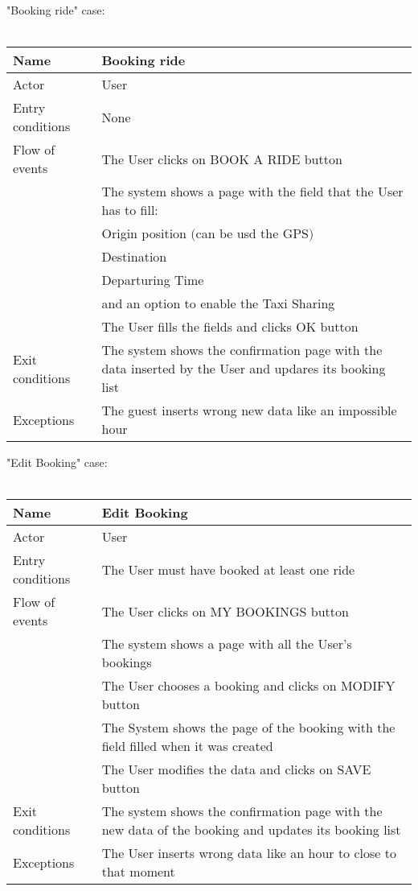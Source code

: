 \newpage
"Booking ride" case:
\\
\\
\begin{tabular}{|l|p{10cm}|} 
\hline
Name & Booking ride\\
\hline
Actor & User\\
\hline
Entry conditions & None\\
\hline
Flow of events
			&	\tabitem The User clicks on BOOK A RIDE button\\
			&	\tabitem The system shows a page with the field that the User has to fill:\\
			&	\tabtratt Origin position $($can be usd the GPS$)$\\
			&	\tabtratt Destination\\
			&	\tabtratt Departuring Time\\
			&	and an option to enable the Taxi Sharing\\
			&	\tabitem The User fills the fields and clicks OK button\\
\hline
Exit conditions & The system shows the confirmation page with the data inserted by the User and updares its booking list\\
\hline
Exceptions & The guest inserts wrong new data like an impossible hour\\
\hline
\end {tabular}


\newpage
"Edit Booking" case:
\\
\\
\begin{tabular}{|l|p{10cm}|} 
\hline
Name & Edit Booking\\
\hline
Actor & User\\
\hline
Entry conditions & The User must have booked at least one ride\\
\hline
Flow of events
			&	\tabitem The User clicks on MY BOOKINGS button\\
			&	\tabitem The system shows a page with all the User's bookings\\
			&	\tabitem The User chooses a booking and clicks on MODIFY button\\
			&	\tabitem The System shows the page of the booking with the field filled when it was created\\
			&	\tabitem The User modifies the data and clicks on SAVE button\\
			
\hline
Exit conditions & The system shows the confirmation page with the new data of the booking and updates its booking list\\
\hline
Exceptions & The User inserts wrong data like an hour to close to that moment\\
\hline
\end {tabular}

